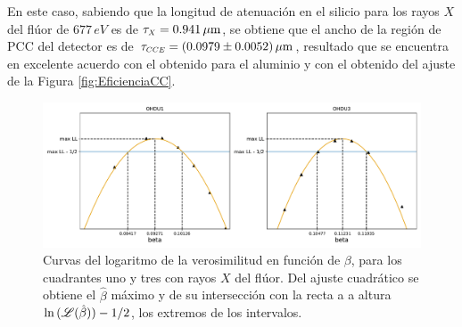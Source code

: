 En este caso, sabiendo que la longitud de atenuación en el silicio para los rayos $X$ del flúor de $677\,\si{eV}$ es de $\tau_{\scaleto{X}{4pt}} = 0.941\,\si{\mu m}$\cite{AttenuationLength}, se obtiene que el ancho de la región de PCC del detector es de $\tau_{\scaleto{CCE}{4pt}} = (0.0979 \pm 0.0052)\,\si{\mu m}$, resultado que se encuentra en excelente acuerdo con el obtenido para el aluminio y con el obtenido del ajuste de la Figura \ref{fig:EficienciaCC}\cite{PCC-CCE-interno}.

\begin{figure}[h]
    \centering
    \includegraphics[scale=0.5]{Figs/F_barridos_beta.pdf}
    \caption{Curvas del logaritmo de la verosimilitud en función de $\beta$, para los cuadrantes uno y tres con rayos $X$ del flúor. Del ajuste cuadrático se obtiene el $\hat{\beta}$ máximo y de su intersección con la recta a a altura $\ln{(\mathscr{L}(\hat{\beta}))} - 1/2$, los extremos de los intervalos.}
    \label{fig:F_barridos_beta}
\end{figure}

